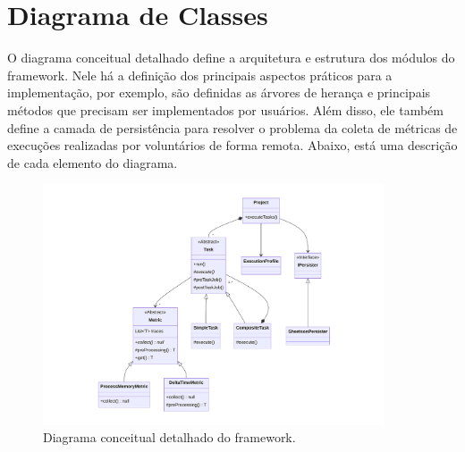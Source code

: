 \documentclass[12pt]{tcc}
\begin{document}
		
	\section{Diagrama de Classes}
	\label{cap:diagrama_de_classe}


	O diagrama conceitual detalhado define a arquitetura e estrutura dos módulos do framework.
	Nele há a definição dos principais aspectos práticos para a implementação, por exemplo, são definidas as árvores de herança e principais métodos que precisam ser implementados por usuários.
	Além disso, ele também define a camada de persistência para resolver o problema da coleta de métricas de execuções realizadas por voluntários de forma remota.
	Abaixo, está uma descrição de cada elemento do diagrama.

	\begin{figure}[!ht]
		\centering
		\includegraphics[width=0.9\textwidth]{figures/diagrama-classes.pdf}
		\caption{Diagrama conceitual detalhado do framework.}
		\label{fig:diag-classes}
	\end{figure}
\end{document}
